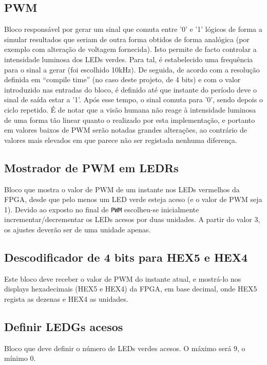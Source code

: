 \documentclass[a4paper,11pt,openright,oneside]{report}
\begin{document}
\subsection*{PWM}

Bloco responsável por gerar um sinal que comuta entre '0' e '1' lógicos de forma a simular resultados que seriam de outra forma obtidos de forma analógica (por exemplo com alteração de voltagem fornecida). Isto permite de facto controlar a intensidade luminosa dos LEDs verdes. Para tal, é estabelecido uma frequência para o sinal a gerar (foi escolhido 10kHz). De seguida, de acordo com a resolução definida em ``compile time'' (no caso deste projeto, de 4 bits) e com o valor introduzido nas entradas do bloco, é definido até que instante do período deve o sinal de saída estar a '1'. Após esse tempo, o sinal comuta para '0', sendo depois o ciclo repetido. É de notar que a visão humana não reage à intensidade luminosa de uma forma tão linear quanto o realizado por esta implementação, e portanto em valores baixos de PWM serão notadas grandes alterações, ao contrário de valores mais elevados em que parece não ser registada nenhuma diferença.

\subsection*{Mostrador de PWM em LEDRs}

Bloco que mostra o valor de PWM de um instante nos LEDs vermelhos da FPGA, desde que pelo menos um LED verde esteja aceso (e o valor de PWM seja 1). Devido ao exposto no final de \verb|PWM| escolheu-se inicialmente incrementar/decrementar os LEDs acesos por duas unidades. A partir do valor 3, os ajustes deverão ser de uma unidade apenas.

\subsection*{Descodificador de 4 bits para HEX5 e HEX4}

Este bloco deve receber o valor de PWM do instante atual, e mostrá-lo nos displays hexadecimais (HEX5 e HEX4) da FPGA, em base decimal, onde HEX5 regista as dezenas e HEX4 as unidades.

\subsection*{Definir LEDGs acesos}

Bloco que deve definir o número de LEDs verdes acesos. O máximo será 9, o mínimo 0.
\end{document}
